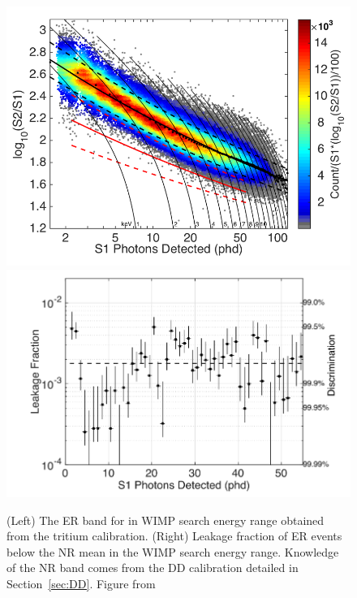 \begin{figure}[htbp]
\begin{center}
\includegraphics[width=\halffig]{figures/lux/lux_tritium2a.png}
\includegraphics[width=\halffig]{figures/lux/lux_tritium2b.png}
\caption{ (Left) The \ac{ER} band for in \ac{WIMP} search energy range obtained from the tritium calibration. (Right) Leakage fraction of \ac{ER} events below the \ac{NR} mean in the \ac{WIMP} search energy range. Knowledge of the \ac{NR} band comes from the DD calibration detailed in Section~\ref{sec:DD}. Figure from \cite{LUXTritium}}
\label{fig:tritium2}
\end{center}
\end{figure}

